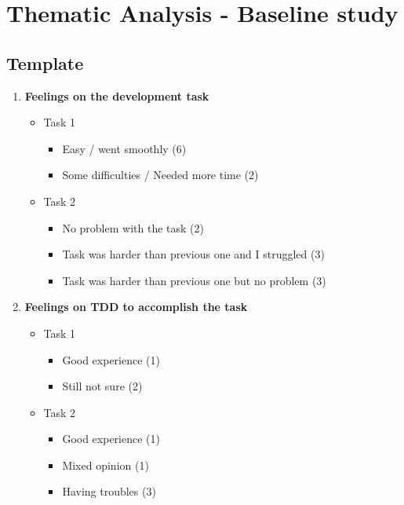 \chapter{Thematic Analysis - Baseline study}

\section{Template}
\begin{enumerate}
    \item \textbf{Feelings on the development task}
    \begin{itemize}
        \item Task 1
        \begin{itemize}
            \item Easy / went smoothly (6)
            \item Some difficulties / Needed more time (2)
        \end{itemize}
        \item Task 2
        \begin{itemize}
            \item No problem with the task (2)
            \item Task was harder than previous one and I struggled (3)
            \item Task was harder than previous one but no problem (3)
        \end{itemize}
    \end{itemize}

    \item \textbf{Feelings on TDD to accomplish the task}
    \begin{itemize}
        \item Task 1
        \begin{itemize}
            \item Good experience (1)
            \item Still not sure (2)
        \end{itemize}
        \item Task 2
        \begin{itemize}
            \item Good experience (1)
            \item Mixed opinion (1)
            \item Having troubles (3)
        \end{itemize}
    \end{itemize}
    

\end{enumerate}
